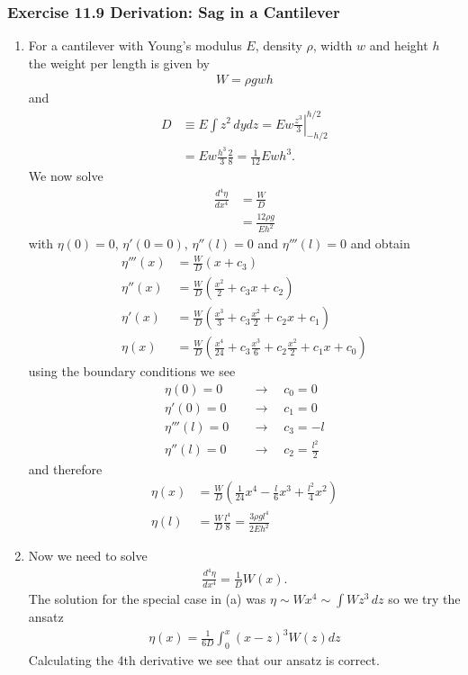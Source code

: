 \documentclass[10pt,a4paper]{book}
\theoremstyle{definition}
\begin{document}
\subsubsection{Exercise 11.9 Derivation: Sag in a Cantilever}
\begin{enumerate}[label=(\alph*)]
\item For a cantilever with Young's modulus $E$, density $\rho$, width $w$ and height $h$ the weight per length is given by
\begin{align}
    W=\rho g w h
\end{align}
and
\begin{align}
    D&\equiv E\int z^2\,dydz=Ew \left.\frac{z^3}{3}\right|_{-h/2}^{h/2}\\
    &=Ew\frac{h^3}{3}\frac{2}{8}=\frac{1}{12}Ewh^3.
\end{align}
We now solve
\begin{align}
    \frac{d^4\eta}{dx^4}
    &=\frac{W}{D}\\
    &=\frac{12\rho g}{Eh^2}
\end{align}
with $\eta(0)=0$, $\eta'(0=0)$, $\eta''(l)=0$ and $\eta'''(l)=0$ and obtain
\begin{align}
    \eta'''(x)&=\frac{W}{D}\left(x+c_3\right)\\
    \eta''(x)&=\frac{W}{D}\left(\frac{x^2}{2}+c_3x+c_2\right)\\
    \eta'(x)&=\frac{W}{D}\left(\frac{x^3}{3}+c_3\frac{x^2}{2}+c_2x +c_1\right)\\
    \eta(x)&=\frac{W}{D}\left(\frac{x^4}{24}+c_3\frac{x^3}{6}+c_2\frac{x^2}{2} +c_1x+c_0\right)
\end{align}
using the boundary conditions we see
\begin{align}
    \eta(0)=0    \quad&\rightarrow\quad c_0=0\\
    \eta'(0)=0   \quad&\rightarrow\quad c_1=0\\
    \eta'''(l)=0 \quad&\rightarrow\quad c_3=-l\\
    \eta''(l)=0  \quad&\rightarrow\quad c_2=\frac{l^2}{2}
\end{align}
and therefore
\begin{align}
    \eta(x)&=\frac{W}{D}\left(\frac{1}{24}x^4-\frac{l}{6}x^3+\frac{l^2}{4}x^2\right)\\
    \eta(l)&=\frac{W}{D}\frac{l^4}{8}=\frac{3\rho gl^4}{2Eh^2}
\end{align}

\item Now we need to solve
\begin{align}
    \frac{d^4\eta}{dx^4}=\frac{1}{D}W(x).
\end{align}
The solution for the special case in (a) was $\eta\sim W x^4\sim\int W z^3\,dz$ so we try the ansatz
\begin{align}
    \eta(x)=\frac{1}{6D}\int_0^x(x-z)^3W(z)dz
\end{align}
Calculating the 4th derivative we see that our ansatz is correct.


\end{enumerate}
\end{document}
